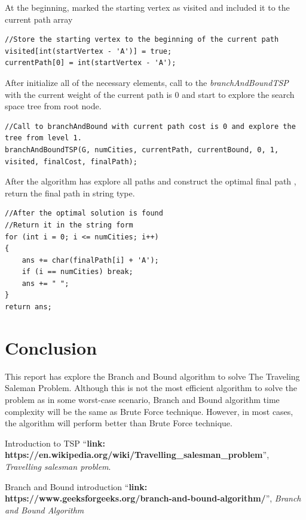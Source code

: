 \documentclass[a4paper]{article}
\begin{document}
At the beginning, marked the starting vertex as visited and included it to the current path array
\begin{verbatim}
//Store the starting vertex to the beginning of the current path
visited[int(startVertex - 'A')] = true;
currentPath[0] = int(startVertex - 'A');
\end{verbatim}
After initialize all of the necessary elements, call to the \textit{branchAndBoundTSP} with the current weight of the current path is 0 and start to explore the search space tree from root node.
\begin{verbatim}
//Call to branchAndBound with current path cost is 0 and explore the tree from level 1. 
branchAndBoundTSP(G, numCities, currentPath, currentBound, 0, 1, visited, finalCost, finalPath);
\end{verbatim}
After the algorithm has explore all paths and construct the optimal final path , return the final path in string type.
\begin{verbatim}
//After the optimal solution is found
//Return it in the string form
for (int i = 0; i <= numCities; i++)
{
    ans += char(finalPath[i] + 'A');
    if (i == numCities) break;
    ans += " ";
}
return ans;
\end{verbatim}

\section{Conclusion}
This report has explore the Branch and Bound algorithm to solve The Traveling Saleman Problem. Although this is not the most efficient algorithm to solve the problem as in some worst-case scenario, Branch and Bound algorithm time complexity will be the same as Brute Force technique. However, in most cases, the algorithm will perform better than Brute Force technique.

\begin{thebibliography}{80}

Introduction to TSP
``\textbf{link: https://en.wikipedia.org/wiki/Travelling\_salesman\_problem}'',
\textit{Travelling salesman problem}.

Branch and Bound introduction
``\textbf{link: https://www.geeksforgeeks.org/branch-and-bound-algorithm/}'', \textit{Branch and Bound Algorithm}


\end{thebibliography}
\end{document}
